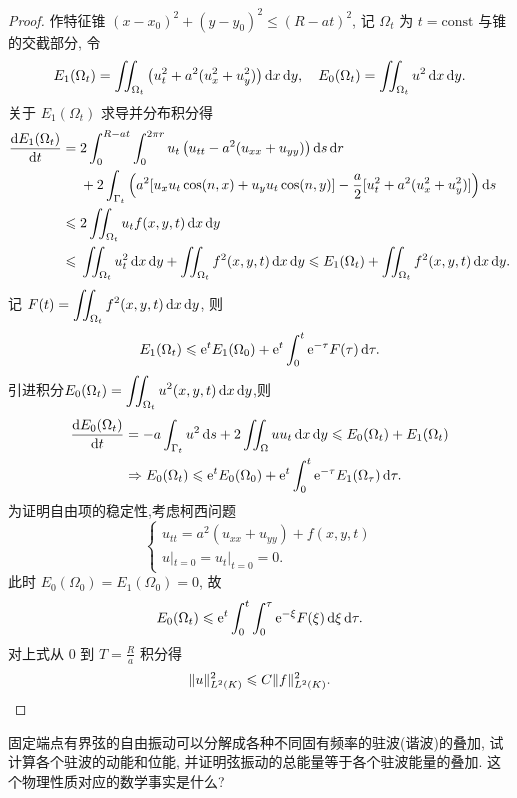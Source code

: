 \begin{proof}
  作特征锥 $(x-x_0)^2+(y-y_0)^2\leq (R-at)^2$,
  记 $\Omega_t$ 为 $t=\text{const}$ 与锥的交截部分, 令
  \[E_1(\Omega_t)=\iint_{\Omega_t}\left(u_t^2+a^2(u_x^2+u_y^2)\right)\diff x\diff y,
    \quad E_0(\Omega_t)=\iint_{\Omega_t}u^2\diff x\diff y.\]
  关于 $E_1(\Omega_t)$ 求导并分布积分得
  \begin{align*}
    \frac{\diff E_1(\Omega_t)}{\diff t}
    ={} & 2\int_0^{R-at}\int_0^{2\pi r} u_t\left(u_{tt}-a^2(u_{xx}+u_{yy})\right)
          \diff s\diff r \\
        & + 2\int_{\Gamma_t} \left(a^2[u_xu_t\cos(n,x)+u_yu_t\cos(n,y)]
          - \frac{a}{2}[u_t^2+a^2(u_x^2+u_y^2)]\right)\diff s \\
    \leq{} & 2\iint_{\Omega_t} u_t f(x,y,t)\diff x\diff y \\
    \leq{} & \iint_{\Omega_t}u_t^2\diff x\diff y + \iint_{\Omega_t}f^2(x,y,t)\diff x\diff y 
          \leq E_1(\Omega_t) + \iint_{\Omega_t} f^2(x,y,t) \diff x\diff y.
  \end{align*}
  记 $\displaystyle F(t)=\iint_{\Omega_t} f^2(x,y,t) \diff x\diff y$, 则
  \[E_1(\Omega_t) \leq \e^t E_1(\Omega_0) + \e^t \int_0^t\e^{-\tau}F(\tau)\diff\tau.\]
  引进积分$\displaystyle E_0(\Omega_t)=\iint_{\Omega_t} u^2(x,y,t) \diff x\diff y$,则
  \[\begin{split}
    \frac{\diff E_0(\Omega_t)}{\diff t}
    & = -a\int_{\Gamma_t}u^2\diff s+2\iint_{\Omega}uu_t\diff x\diff y\leq E_0(\Omega_t)
      + E_1(\Omega_t) \\
    & \Rightarrow E_0(\Omega_t)\leq \e^tE_0(\Omega_0)
      + \e^t\int_0^t\e^{-\tau}E_1(\Omega_{\tau})\diff\tau.
  \end{split}\]
  为证明自由项的稳定性,考虑柯西问题
  \[\begin{cases}
    u_{tt} = a^2(u_{xx}+u_{yy})+f(x,y,t) \\
    u|_{t=0} = u_t|_{t=0} = 0.
  \end{cases}\]
  此时 $E_0(\Omega_0) = E_1(\Omega_0) = 0$, 故
  \[E_0(\Omega_t)\leq \e^t\int_0^t \int_0^{\tau} \e^{-\xi}F(\xi) \diff\xi\diff\tau.\]
  对上式从 $0$ 到 $\displaystyle T=\frac Ra$ 积分得
  \[\|u\|_{L^2(K)}^2\leq C\|f\|_{L^2(K)}^2.\qedhere\]
\end{proof}


\begin{exercise}
  固定端点有界弦的自由振动可以分解成各种不同固有频率的驻波(谐波)的叠加,
  试计算各个驻波的动能和位能, 并证明弦振动的总能量等于各个驻波能量的叠加.
  这个物理性质对应的数学事实是什么?
\end{exercise}


